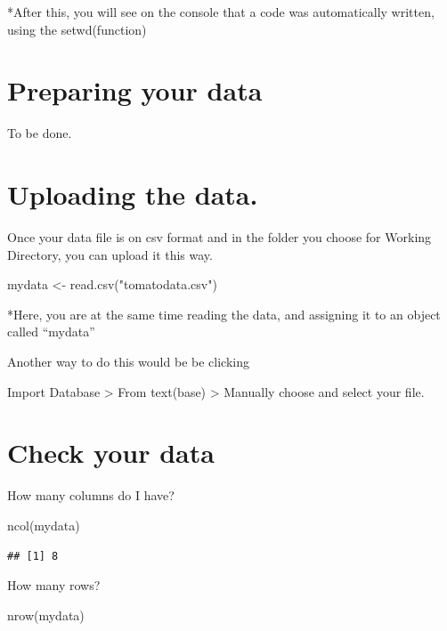 \documentclass[
]{book}
\newenvironment{Shaded}{\begin{snugshade}}{\end{snugshade}}
\newcommand{\FunctionTok}[1]{\textcolor[rgb]{0.00,0.00,0.00}{#1}}
\newcommand{\NormalTok}[1]{#1}
\newcommand{\OtherTok}[1]{\textcolor[rgb]{0.56,0.35,0.01}{#1}}
\newcommand{\StringTok}[1]{\textcolor[rgb]{0.31,0.60,0.02}{#1}}
\begin{document}
*After this, you will see on the console that a code was automatically written, using the setwd(function)

\hypertarget{preparing-your-data}{%
\section{Preparing your data}\label{preparing-your-data}}

To be done.

\hypertarget{uploading-the-data.}{%
\section{Uploading the data.}\label{uploading-the-data.}}

Once your data file is on csv format and in the folder you choose for Working Directory, you can upload it this way.

\begin{Shaded}
\begin{Highlighting}[]
\NormalTok{mydata }\OtherTok{\textless{}{-}} \FunctionTok{read.csv}\NormalTok{(}\StringTok{"tomatodata.csv"}\NormalTok{)}
\end{Highlighting}
\end{Shaded}

*Here, you are at the same time reading the data, and assigning it to an object called ``mydata''

Another way to do this would be be clicking

Import Database \textgreater{} From text(base) \textgreater{} Manually choose and select your file.

\hypertarget{check-your-data}{%
\section{Check your data}\label{check-your-data}}

How many columns do I have?

\begin{Shaded}
\begin{Highlighting}[]
\FunctionTok{ncol}\NormalTok{(mydata)}
\end{Highlighting}
\end{Shaded}

\begin{verbatim}
## [1] 8
\end{verbatim}

How many rows?

\begin{Shaded}
\begin{Highlighting}[]
\FunctionTok{nrow}\NormalTok{(mydata)}
\end{Highlighting}
\end{Shaded}
\end{document}
